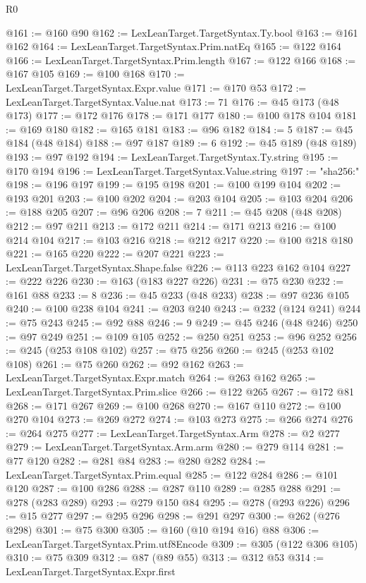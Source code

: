 \begin{lexlean}{R0}
\begin{coremodule}
@161 := @160 @90
@162 := LexLeanTarget.TargetSyntax.Ty.bool
@163 := @161 @162
@164 := LexLeanTarget.TargetSyntax.Prim.natEq
@165 := @122 @164
@166 := LexLeanTarget.TargetSyntax.Prim.length
@167 := @122 @166
@168 := @167 @105
@169 := @100 @168
@170 := LexLeanTarget.TargetSyntax.Expr.value
@171 := @170 @53
@172 := LexLeanTarget.TargetSyntax.Value.nat
@173 := 71
@176 := @45 @173 (@48 @173)
@177 := @172 @176
@178 := @171 @177
@180 := @100 @178 @104
@181 := @169 @180
@182 := @165 @181
@183 := @96 @182
@184 := 5
@187 := @45 @184 (@48 @184)
@188 := @97 @187
@189 := 6
@192 := @45 @189 (@48 @189)
@193 := @97 @192
@194 := LexLeanTarget.TargetSyntax.Ty.string
@195 := @170 @194
@196 := LexLeanTarget.TargetSyntax.Value.string
@197 := "sha256:"
@198 := @196 @197
@199 := @195 @198
@201 := @100 @199 @104
@202 := @193 @201
@203 := @100 @202
@204 := @203 @104
@205 := @103 @204
@206 := @188 @205
@207 := @96 @206
@208 := 7
@211 := @45 @208 (@48 @208)
@212 := @97 @211
@213 := @172 @211
@214 := @171 @213
@216 := @100 @214 @104
@217 := @103 @216
@218 := @212 @217
@220 := @100 @218 @180
@221 := @165 @220
@222 := @207 @221
@223 := LexLeanTarget.TargetSyntax.Shape.false
@226 := @113 @223 @162 @104
@227 := @222 @226
@230 := @163 (@183 @227 @226)
@231 := @75 @230
@232 := @161 @88
@233 := 8
@236 := @45 @233 (@48 @233)
@238 := @97 @236 @105
@240 := @100 @238 @104
@241 := @203 @240
@243 := @232 (@124 @241)
@244 := @75 @243
@245 := @92 @88
@246 := 9
@249 := @45 @246 (@48 @246)
@250 := @97 @249
@251 := @109 @105
@252 := @250 @251
@253 := @96 @252
@256 := @245 (@253 @108 @102)
@257 := @75 @256
@260 := @245 (@253 @102 @108)
@261 := @75 @260
@262 := @92 @162
@263 := LexLeanTarget.TargetSyntax.Expr.match
@264 := @263 @162
@265 := LexLeanTarget.TargetSyntax.Prim.slice
@266 := @122 @265
@267 := @172 @81
@268 := @171 @267
@269 := @100 @268
@270 := @167 @110
@272 := @100 @270 @104
@273 := @269 @272
@274 := @103 @273
@275 := @266 @274
@276 := @264 @275
@277 := LexLeanTarget.TargetSyntax.Arm
@278 := @2 @277
@279 := LexLeanTarget.TargetSyntax.Arm.arm
@280 := @279 @114
@281 := @77 @120
@282 := @281 @84
@283 := @280 @282
@284 := LexLeanTarget.TargetSyntax.Prim.equal
@285 := @122 @284
@286 := @101 @120
@287 := @100 @286
@288 := @287 @110
@289 := @285 @288
@291 := @278 (@283 @289)
@293 := @279 @150 @84
@295 := @278 (@293 @226)
@296 := @15 @277
@297 := @295 @296
@298 := @291 @297
@300 := @262 (@276 @298)
@301 := @75 @300
@305 := @160 (@10 @194 @16) @88
@306 := LexLeanTarget.TargetSyntax.Prim.utf8Encode
@309 := @305 (@122 @306 @105)
@310 := @75 @309
@312 := @87 (@89 @55)
@313 := @312 @53
@314 := LexLeanTarget.TargetSyntax.Expr.first

\end{coremodule}
\end{lexlean}
